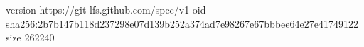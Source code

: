 version https://git-lfs.github.com/spec/v1
oid sha256:2b7b147b118d237298e07d139b252a374ad7e98267e67bbbee64e27e41749122
size 262240
